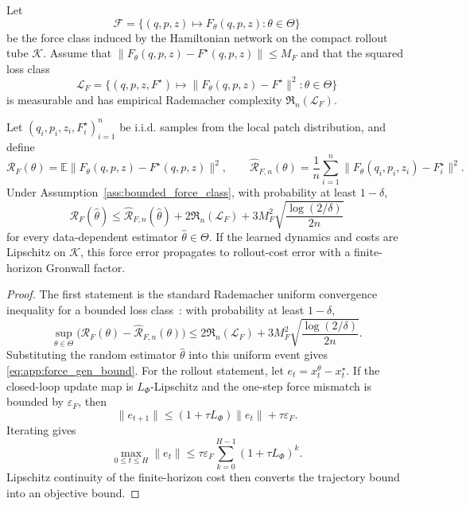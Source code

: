 \begin{assumption}
\label{ass:bounded_force_class}
Let
\[
    \mathcal F=\{(q,p,z)\mapsto F_\theta(q,p,z):\theta\in\Theta\}
\]
be the force class induced by the Hamiltonian network on the compact rollout tube
$\mathcal K$. Assume that
$\|F_\theta(q,p,z)-F^\star(q,p,z)\|\le M_F$ and that the squared loss class
\[
    \mathcal L_F
    =
    \{(q,p,z,F^\star)\mapsto \|F_\theta(q,p,z)-F^\star\|^2:\theta\in\Theta\}
\]
is measurable and has empirical Rademacher complexity
$\mathfrak R_n(\mathcal L_F)$.
\end{assumption}

\begin{theorem}
\label{thm:force_generalization}
Let $(q_i,p_i,z_i,F_i^\star)_{i=1}^n$ be i.i.d. samples from the local patch
distribution, and define
\[
    \mathcal R_F(\theta)
    =
    \mathbb E\|F_\theta(q,p,z)-F^\star(q,p,z)\|^2,
    \qquad
    \widehat{\mathcal R}_{F,n}(\theta)
    =
    \frac1n\sum_{i=1}^n
    \|F_\theta(q_i,p_i,z_i)-F_i^\star\|^2 .
\]
Under Assumption~\ref{ass:bounded_force_class}, with probability at least
$1-\delta$,
\begin{equation}
    \mathcal R_F(\hat\theta)
    \le
    \widehat{\mathcal R}_{F,n}(\hat\theta)
    +
    2\mathfrak R_n(\mathcal L_F)
    +
    3M_F^2\sqrt{\frac{\log(2/\delta)}{2n}}
    \label{eq:app:force_gen_bound}
\end{equation}
for every data-dependent estimator $\hat\theta\in\Theta$. If the learned dynamics and
costs are Lipschitz on $\mathcal K$, this force error propagates to rollout-cost error
with a finite-horizon Gronwall factor.
\end{theorem}

\begin{proof}
The first statement is the standard Rademacher uniform convergence inequality for a
bounded loss class~\citep{bartlett2002rademacher,ShalevShwartzBenDavid2014}:
with probability at least $1-\delta$,
\[
    \sup_{\theta\in\Theta}
    \bigl(\mathcal R_F(\theta)-\widehat{\mathcal R}_{F,n}(\theta)\bigr)
    \le
    2\mathfrak R_n(\mathcal L_F)
    +
    3M_F^2\sqrt{\frac{\log(2/\delta)}{2n}} .
\]
Substituting the random estimator $\hat\theta$ into this uniform event gives
\eqref{eq:app:force_gen_bound}. For the rollout statement, let
$e_t=x_t^\theta-x_t^\star$. If the closed-loop update map is $L_\Phi$-Lipschitz and
the one-step force mismatch is bounded by $\varepsilon_F$, then
\[
    \|e_{t+1}\|
    \le
    (1+\tau L_\Phi)\|e_t\|+\tau\varepsilon_F .
\]
Iterating gives
\[
    \max_{0\le t\le H}\|e_t\|
    \le
    \tau\varepsilon_F
    \sum_{k=0}^{H-1}(1+\tau L_\Phi)^k .
\]
Lipschitz continuity of the finite-horizon cost then converts the trajectory bound into
an objective bound.
\end{proof}


